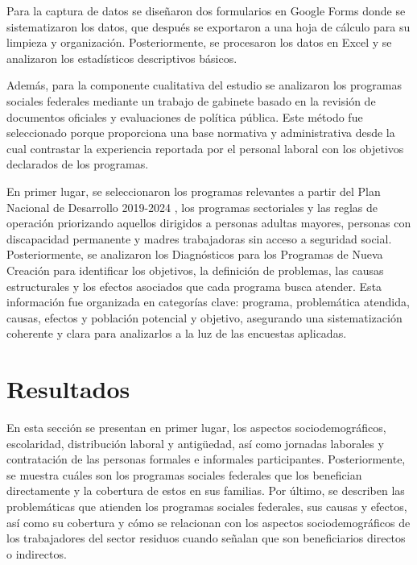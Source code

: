 \documentclass[
  spanish,
  11pt,
  a4paper,
]{scrbook}
\begin{document}
Para la captura de datos se diseñaron dos formularios en Google Forms
donde se sistematizaron los datos, que después se exportaron a una hoja
de cálculo para su limpieza y organización. Posteriormente, se
procesaron los datos en Excel y se analizaron los estadísticos
descriptivos básicos.

Además, para la componente cualitativa del estudio se analizaron los
programas sociales federales mediante un trabajo de gabinete basado en
la revisión de documentos oficiales y evaluaciones de política pública.
Este método fue seleccionado porque proporciona una base normativa y
administrativa desde la cual contrastar la experiencia reportada por el
personal laboral con los objetivos declarados de los programas.

En primer lugar, se seleccionaron los programas relevantes a partir del
Plan Nacional de Desarrollo 2019-2024 \autocite{GobiernoDeMexico2019},
los programas sectoriales y las reglas de operación priorizando aquellos
dirigidos a personas adultas mayores, personas con discapacidad
permanente y madres trabajadoras sin acceso a seguridad social.
Posteriormente, se analizaron los Diagnósticos para los Programas de
Nueva Creación para identificar los objetivos, la definición de
problemas, las causas estructurales y los efectos asociados que cada
programa busca atender. Esta información fue organizada en categorías
clave: programa, problemática atendida, causas, efectos y población
potencial y objetivo, asegurando una sistematización coherente y clara
para analizarlos a la luz de las encuestas aplicadas.

\section*{Resultados}\label{resultados}


En esta sección se presentan en primer lugar, los aspectos
sociodemográficos, escolaridad, distribución laboral y antigüedad, así
como jornadas laborales y contratación de las personas formales e
informales participantes. Posteriormente, se muestra cuáles son los
programas sociales federales que los benefician directamente y la
cobertura de estos en sus familias. Por último, se describen las
problemáticas que atienden los programas sociales federales, sus causas
y efectos, así como su cobertura y cómo se relacionan con los aspectos
sociodemográficos de los trabajadores del sector residuos cuando señalan
que son beneficiarios directos o indirectos.
\end{document}
